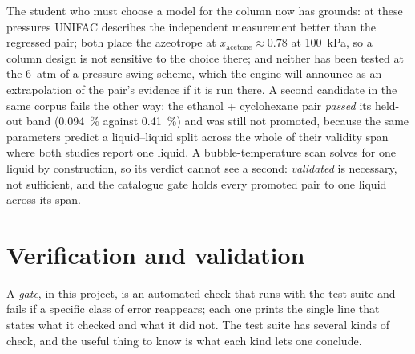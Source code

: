 \documentclass[11pt,a4paper]{article}
\begin{document}
The student who must choose a model for the column now has grounds: at
these pressures UNIFAC describes the independent measurement better than
the regressed pair; both place the azeotrope at $x_\mathrm{acetone}
\approx 0.78$ at 100~kPa, so a column design is not sensitive to the choice
there; and neither has been tested at the 6~atm of a pressure-swing
scheme, which the engine will announce as an extrapolation of the pair's
evidence if it is run there.  A second candidate in the same corpus fails
the other way: the ethanol + cyclohexane pair \emph{passed} its held-out
band (0.094~\% against 0.41~\%) and was still not promoted, because the
same parameters predict a liquid--liquid split across the whole of their
validity span where both studies report one liquid.  A bubble-temperature
scan solves for one liquid by construction, so its verdict cannot see a
second: \emph{validated} is necessary, not sufficient, and the catalogue
gate holds every promoted pair to one liquid across its span.

\FloatBarrier
\section{Verification and validation}
\label{sec:vv}

A \emph{gate}, in this project, is an automated check that runs with the
test suite and fails if a specific class of error reappears; each one
prints the single line that states what it checked and what it did not.
The test suite has several kinds of check, and the useful thing to know is
what each kind lets one conclude.
\end{document}
